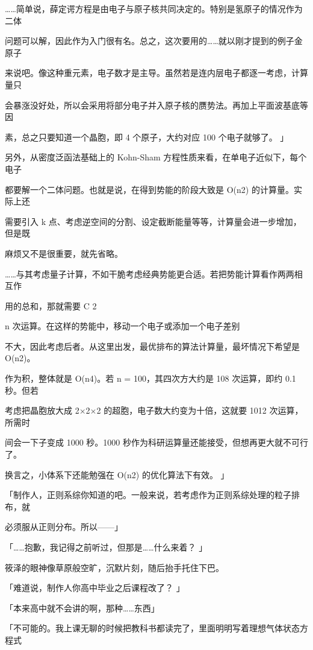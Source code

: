 ……简单说，薛定谔方程是由电子与原子核共同决定的。特别是氢原子的情况作为二体\par
问题可以解，因此作为入门很有名。总之，这次要用的……就以刚才提到的例子金原子\par
来说吧。像这种重元素，电子数才是主导。虽然若是连内层电子都逐一考虑，计算量只\par
会暴涨没好处，所以会采用将部分电子并入原子核的赝势法。再加上平面波基底等因\par
素，总之只要知道一个晶胞，即 4 个原子，大约对应 100 个电子就够了。 」\par
另外，从密度泛函法基础上的 Kohn-Sham 方程性质来看，在单电子近似下，每个电子\par
都要解一个二体问题。也就是说，在得到势能的阶段大致是 O(n2) 的计算量。实际上还\par
需要引入 k 点、考虑逆空间的分割、设定截断能量等等，计算量会进一步增加，但是既\par
麻烦又不是很重要，就先省略。\par
……与其考虑量子计算，不如干脆考虑经典势能更合适。若把势能计算看作两两相互作\par
用的总和，那就需要 C 2\par
n 次运算。在这样的势能中，移动一个电子或添加一个电子差别\par
不大，因此考虑后者。从这里出发，最优排布的算法计算量，最坏情况下希望是O(n2)。\par
作为积，整体就是 O(n4)。若 n = 100，其四次方大约是 108 次运算，即约 0.1 秒。但若\par
考虑把晶胞放大成 2$\times$2$\times$2 的超胞，电子数大约变为十倍，这就要 1012 次运算，所需时\par
间会一下子变成 1000 秒。1000 秒作为科研运算量还能接受，但想再更大就不可行了。\par
换言之，小体系下还能勉强在 O(n2) 的优化算法下有效。 」\par
「制作人，正则系综你知道的吧。一般来说，若考虑作为正则系综处理的粒子排布，就\par
必须服从正则分布。所以——」\par
「……抱歉，我记得之前听过，但那是……什么来着？ 」\par
筱泽的眼神像草原般空旷，沉默片刻，随后抬手托住下巴。\par
「难道说，制作人你高中毕业之后课程改了？ 」\par
「本来高中就不会讲的啊，那种……东西」\par
「不可能的。我上课无聊的时候把教科书都读完了，里面明明写着理想气体状态方程式\par
